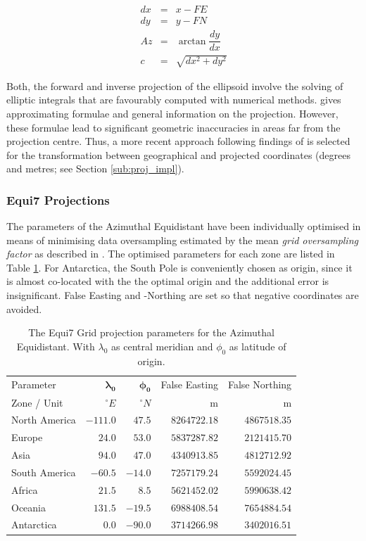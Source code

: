 \documentclass[10pt,a4paper]{article}
\begin{document}
\begin{eqnarray}
dx &=& x - FE \\
dy &=& y - FN \\
\mathit{Az} &=& \arctan \dfrac{dy}{dx} \\
c &=& \sqrt{dx^2 + dy^2}
\label{eq:forward}
\end{eqnarray}

Both, the forward and inverse projection of the ellipsoid involve the solving of elliptic integrals that are favourably computed with numerical methods. \cite{Snyder1987} gives approximating formulae and general information on the projection. However, these formulae lead to significant geometric inaccuracies in areas far from the projection centre. Thus, a more recent approach following findings of \citep{Karney2011, Karney2013} is selected for the transformation between geographical and projected coordinates (degrees and metres; see Section \ref{sub:proj_impl}).

\subsubsection{Equi7 Projections}

The parameters of the Azimuthal Equidistant have been individually optimised in means of minimising data oversampling estimated by the mean \textit{grid oversampling factor} as described in \cite{Bauer-Marschallinger2014}. The optimised parameters for each zone are listed in Table \ref{tab:projections}. For Antarctica, the South Pole is conveniently chosen as origin, since it is almost co-located with the the optimal origin and the additional error is insignificant. False Easting and -Northing are set so that negative coordinates are avoided. 

\begin{table}[hbtp]
\caption[Projection Parameter]{
The Equi7 Grid projection parameters for the Azimuthal Equidistant. With $\lambda_{0}$ as central meridian and $\phi_{0}$ as latitude of origin.
}
\centering
	{
	\begin{tabular}{lrrrr}
	\hline
	Parameter & $\mathbf{\lambda_{0}}$ & $\mathbf{\phi_{0}}$ & False Easting & False Northing \\
	Zone / Unit & $^{\circ}E$ & $^{\circ}N$ & m & m \\
	\hline
	North America & $-111.0$ & $47.5$ & $8264722.18$ & $4867518.35$ \\
	Europe & $24.0$ & $53.0$ & $5837287.82$ & $2121415.70$ \\
	Asia & $94.0$ & $47.0$ & $4340913.85$ & $4812712.92$ \\
	South America & $-60.5$ & $-14.0$ & $7257179.24$ & $5592024.45$ \\
	Africa & $21.5$ & $8.5$ & $5621452.02$ & $5990638.42$ \\
	Oceania & $131.5$ & $-19.5$ & $6988408.54$ & $7654884.54$ \\
	Antarctica & $0.0$ & $-90.0$ & $3714266.98$ & $3402016.51$ \\
	\hline
	\end{tabular} 
	}
\label{tab:projections}
\end{table}
\end{document}
